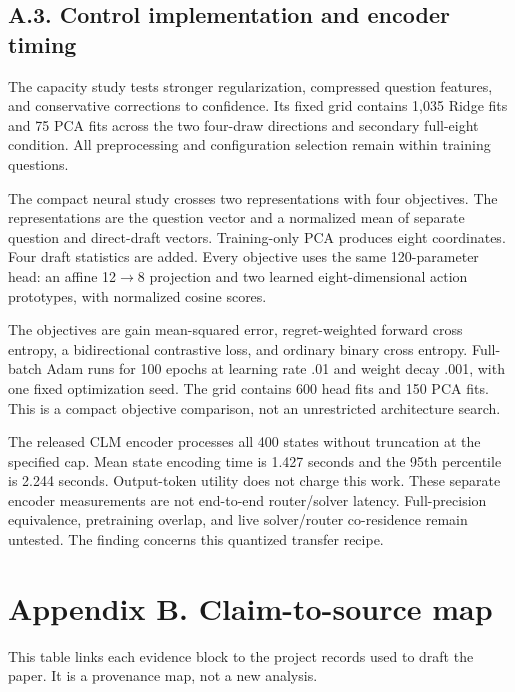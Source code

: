 \documentclass[11pt,a4paper]{article}
\begin{document}
\subsection*{A.3. Control implementation and encoder timing}\label{sec:a3-control-implementation-and-encoder-timing}
The capacity study tests stronger regularization, compressed question features, and conservative corrections to confidence. Its fixed grid contains 1,035 Ridge fits and 75 PCA fits across the two four-draw directions and secondary full-eight condition. All preprocessing and configuration selection remain within training questions.

The compact neural study crosses two representations with four objectives. The representations are the question vector and a normalized mean of separate question and direct-draft vectors. Training-only PCA produces eight coordinates. Four draft statistics are added. Every objective uses the same 120-parameter head: an affine 12\ensuremath{\rightarrow}8 projection and two learned eight-dimensional action prototypes, with normalized cosine scores.

The objectives are gain mean-squared error, regret-weighted forward cross entropy, a bidirectional contrastive loss, and ordinary binary cross entropy. Full-batch Adam runs for 100 epochs at learning rate .01 and weight decay .001, with one fixed optimization seed. The grid contains 600 head fits and 150 PCA fits. This is a compact objective comparison, not an unrestricted architecture search.

The released CLM encoder processes all 400 states without truncation at the specified cap. Mean state encoding time is 1.427 seconds and the 95th percentile is 2.244 seconds. Output-token utility does not charge this work. These separate encoder measurements are not end-to-end router/solver latency. Full-precision equivalence, pretraining overlap, and live solver/router co-residence remain untested. The finding concerns this quantized transfer recipe.

\section*{Appendix B. Claim-to-source map}\label{sec:appendix-b-claim-to-source-map}
This table links each evidence block to the project records used to draft the paper. It is a provenance map, not a new analysis.
\end{document}
